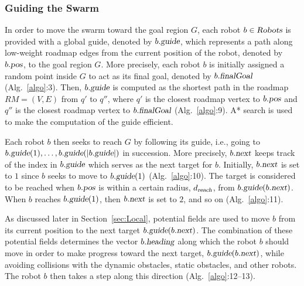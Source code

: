 \documentclass[letterpaper, 10pt, conference]{ieeeconf}
\newcommand{\Var}[1]{\ensuremath{{{\textsl{#1}}}}}
\begin{document}
\subsubsection{Guiding the Swarm}
\label{sec:Guide}

In order to move the swarm toward the goal region $G$, each robot $b
\in \Var{Robots}$ is provided with a global guide, denoted by
$b.\Var{guide}$, which represents a path along low-weight roadmap edges
from the current position of the robot, denoted by $b.\Var{pos}$,  to
the goal region $G$. More precisely, each
robot $b$ is initially assigned a random point inside $G$ to act as
its final goal, denoted by $b.\Var{finalGoal}$ (Alg.~\ref{algo}:3).
Then, $b.\Var{guide}$ is computed as the shortest path in the roadmap
$RM = (V, E)$ from $q'$ to $q''$, where $q'$ is the closest roadmap
vertex to $b.\Var{pos}$ and $q''$ is the closest roadmap vertex to
$b.\Var{finalGoal}$ (Alg.~\ref{algo}:9). A* search is used to make the
computation of the guide efficient. 

Each robot $b$ then seeks to reach $G$ by following its guide, i.e.,
going to $b.\Var{guide}(1), \ldots, b.\Var{guide}(|b.\Var{guide}|)$ in
succession. More precisely, $b.\Var{next}$ keeps track of the index in
$b.\Var{guide}$ which serves as the next target for $b$. Initially,
$b.\Var{next}$ is set to $1$ since $b$ seeks to move to
$b.\Var{guide}(1)$ (Alg.~\ref{algo}:10). The target is considered to
be reached when $b.\Var{pos}$ is within a certain radius,
$d_\Var{reach}$, from $b.\Var{guide}(b.\Var{next})$.  When $b$ reaches
$b.\Var{guide}(1)$, then $b.\Var{next}$ is set to $2$, and so on
(Alg.~\ref{algo}:11).  

As discussed later in Section~\ref{sec:Local}, potential fields are
used to move $b$ from its current position to the next target
$b.\Var{guide}(b.\Var{next})$.  The combination of these potential
fields determines the vector $b.\Var{heading}$ along which the robot
$b$ should move in order to make progress toward the next target,
$b.\Var{guide}(b.\Var{next})$, while avoiding collisions with the
dynamic obstacles, static obstacles, and other robots. The robot $b$
then takes a step along this direction (Alg.~\ref{algo}:12--13).
\end{document}
